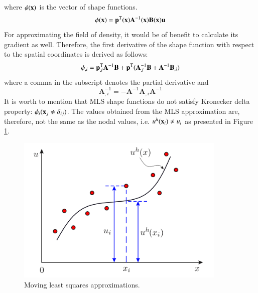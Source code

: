 \documentclass[11pt]{acmeArticle}
\numberwithin{equation}{section}
\begin{document}
where $ \mathbf \phi ({\boldsymbol {\rm x}})$ is the vector of shape functions.
\begin{equation}
\mathbf \phi ({\boldsymbol {\rm x}}) = \mathbf p^{\rm T} ({\boldsymbol {\rm x}}) \mathbf{A}^{-1} ({\boldsymbol {\rm x}}) \mathbf B ({\boldsymbol {\rm x}}) \mathbf u
\end{equation}
For approximating the field of density, it would be of benefit to calculate its gradient as well. Therefore, the first derivative of the shape function with respect to the spatial coordinates is derived as follows: 
\begin{equation}
\phi_{,i} = \mathbf p^{\rm T}_{,i} \mathbf A^{-1} \mathbf B + \mathbf p^{\rm T} ( \mathbf A_{,i}^{-1} \mathbf B + \mathbf A^{-1} \mathbf B_{,i} )
\end{equation}
where a comma in the subscript denotes the partial derivative and 
\begin{equation}
\mathbf A_{,i}^{-1} = -\mathbf A^{-1} \mathbf A_{,i} \mathbf A^{-1}
\end{equation}
It is worth to mention that MLS shape functions do not satisfy Kronecker delta property: $\phi_i({\boldsymbol {\rm x}}_j \neq \delta_{ij}) $. The values obtained from the MLS approximation are, therefore, not the same as the nodal values, i.e. $u^h({\boldsymbol {\rm x}}_i) \neq u_i $ as presented in Figure \ref{fig:mwls_approxi}.
\begin{figure}[h!]
	\begin{centering}
		\includegraphics[width=10cm]{Figures/mwls_approxi.png}
		\caption{Moving least squares approximations.}
		\label{fig:mwls_approxi}
	\end{centering}
\end{figure}
\end{document}
